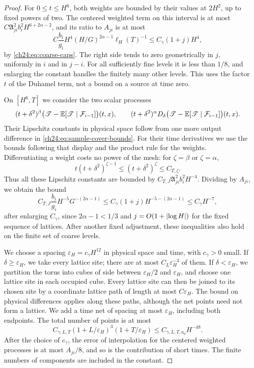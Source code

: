 \begin{proof}
For $0\le t\le H^6$, both weights are bounded by their values at $2H^2$, up to fixed powers of two. The centered weighted term on this interval is at most $C\mathfrak A_{ji}^2b_i^2H^{6+2\alpha-2}$, and its ratio to $A_{ji}$ is at most
\begin{equation}\label{ch24:eq:microscopic-cover-ratio}
 C\frac{b_i}{g_i}H^4(H/G)^{2\alpha-1}\ell_H(T)^{-1}\le C_\gamma(1+j)H^4,
\end{equation}
by \eqref{ch24:eq:coarse-caps}. The right side tends to zero geometrically in $j$, uniformly in $i$ and in $j-i$. For all sufficiently fine levels it is less than $1/8$, and enlarging the constant handles the finitely many other levels. This uses the factor $t$ of the Duhamel term, not a bound on a source at time zero.

On $[H^6,T]$ we consider the two scalar processes
\[
 (t+\delta^2)^\beta\bigl(\mathscr T-\mathbb E[\mathscr T\mid\mathcal F_{i-1}]\bigr)(t,x),\qquad
 (t+\delta^2)^\alpha D_\delta\bigl(\mathscr T-\mathbb E[\mathscr T\mid\mathcal F_{i-1}]\bigr)(t,x).
\]
Their Lipschitz constants in physical space follow from one more output difference in \eqref{ch24:eq:sample-cover-bounds}. For their time derivatives we use the bounds following that display and the product rule for the weights. Differentiating a weight costs no power of the mesh: for $\zeta=\beta$ or $\zeta=\alpha$,
\[
 t(t+\delta^2)^{\zeta-1}\le(t+\delta^2)^\zeta\le C_{T,\zeta}.
\]
Thus all these Lipschitz constants are bounded by $C_{T,J}\mathfrak A_{ji}^2b_i^2H^{-4}$. Dividing by $A_{ji}$, we obtain the bound
\[
 C_{T,J}\frac{b_i}{g_i}H^{-5}G^{-(2\alpha-1)}\le C_\gamma(1+j)H^{-5-(2\alpha-1)}\le C_\gamma H^{-7},
\]
after enlarging $C_\gamma$, since $2\alpha-1<1/3$ and $j=O(1+\lvert \log H\rvert)$ for the fixed sequence of lattices. After another fixed adjustment, these inequalities also hold on the finite set of coarse levels.

We choose a spacing $\varepsilon_H=c_\gamma H^{12}$ in physical space and time, with $c_\gamma>0$ small. If $\delta\ge\varepsilon_H$, we take every lattice site; there are at most $C_L\varepsilon_H^{-3}$ of them. If $\delta<\varepsilon_H$, we partition the torus into cubes of side between $\varepsilon_H/2$ and $\varepsilon_H$, and choose one lattice site in each occupied cube. Every lattice site can then be joined to its chosen site by a coordinate lattice path of length at most $C\varepsilon_H$. The bound on physical differences applies along these paths, although the net points need not form a lattice. We add a time net of spacing at most $\varepsilon_H$, including both endpoints. The total number of points is at most
\begin{equation}\label{ch24:eq:net-cardinality}
 C_{\gamma,L,T}(1+L/\varepsilon_H)^3(1+T/\varepsilon_H)\le C_{\gamma,L,T,a_0}H^{-48}.
\end{equation}
After the choice of $c_\gamma$, the error of interpolation for the centered weighted processes is at most $A_{ji}/8$, and so is the contribution of short times. The finite numbers of components are included in the constant.


\end{proof}
